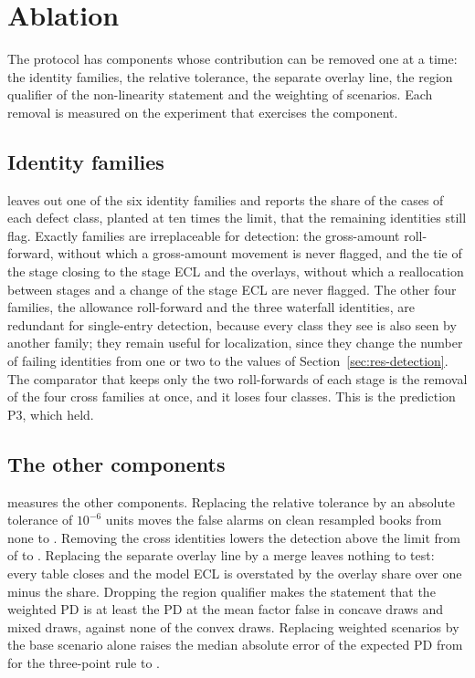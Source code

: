 \section{Ablation}
\label{sec:ablation}

The protocol has components whose contribution can be removed one at a time: the identity families, the relative tolerance, the separate overlay line, the region qualifier of the non-linearity statement and the weighting of scenarios.
Each removal is measured on the experiment that exercises the component.

\subsection{Identity families}
\label{sec:ablation-families}

 leaves out one of the six identity families and reports the share of the \eoneCases{} cases of each defect class, planted at ten times the limit, that the remaining identities still flag.
Exactly \eoneFamiliesLost{} families are irreplaceable for detection: the gross-amount roll-forward, without which a gross-amount movement is never flagged, and the tie of the stage closing to the stage ECL and the overlays, without which a reallocation between stages and a change of the stage ECL are never flagged.
The other four families, the allowance roll-forward and the three waterfall identities, are redundant for single-entry detection, because every class they see is also seen by another family; they remain useful for localization, since they change the number of failing identities from one or two to the values of Section~\ref{sec:res-detection}.
The comparator that keeps only the two roll-forwards of each stage is the removal of the four cross families at once, and it loses four classes.
This is the prediction P3, which held.



\subsection{The other components}
\label{sec:ablation-components}

 measures the other components.
Replacing the relative tolerance by an absolute tolerance of $10^{-6}$ units moves the false alarms on clean resampled books from none to \etwoAbsResPct{}.
Removing the cross identities lowers the detection above the limit from \eoneAboveFullK{} of \eoneAboveFullN{} to \eoneAboveStageK{}.
Replacing the separate overlay line by a merge leaves nothing to test: every table closes and the model ECL is overstated by the overlay share over one minus the share.
Dropping the region qualifier makes the statement that the weighted PD is at least the PD at the mean factor false in \efourConcaveNeg{} concave draws and \efourMixedNeg{} mixed draws, against none of the \efourConvexN{} convex draws.
Replacing weighted scenarios by the base scenario alone raises the median absolute error of the expected PD from \efourGhThreeMed{} for the three-point rule to \efourSingleMed{}.


